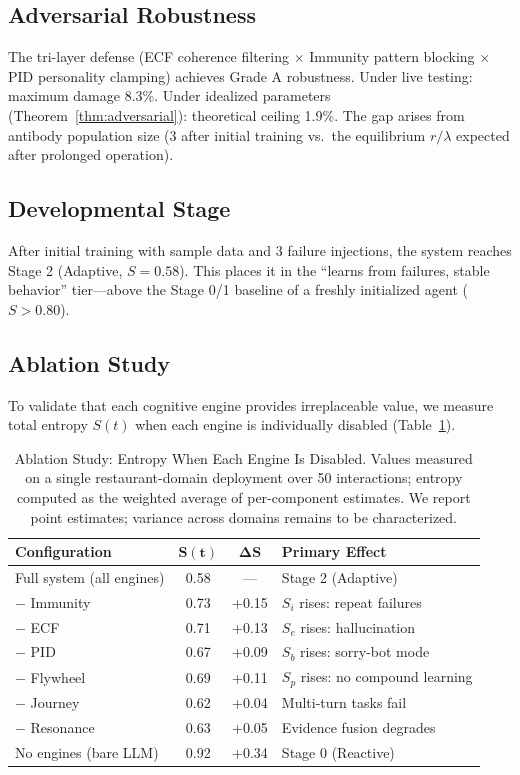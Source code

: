 \documentclass[11pt,a4paper]{article}
\begin{document}
\subsection{Adversarial Robustness}

The tri-layer defense (ECF coherence filtering $\times$ Immunity pattern
blocking $\times$ PID personality clamping) achieves Grade A robustness.
Under live testing: maximum damage 8.3\%. Under idealized parameters
(Theorem~\ref{thm:adversarial}): theoretical ceiling 1.9\%.
The gap arises from antibody population size (3 after initial training
vs.\ the equilibrium $r/\lambda$ expected after prolonged operation).

\subsection{Developmental Stage}

After initial training with sample data and 3 failure injections, the
system reaches Stage 2 (Adaptive, $S = 0.58$). This places it in the
``learns from failures, stable behavior'' tier---above the Stage 0/1
baseline of a freshly initialized agent ($S > 0.80$).

\subsection{Ablation Study}

To validate that each cognitive engine provides irreplaceable value,
we measure total entropy $S(t)$ when each engine is individually disabled
(Table~\ref{tab:ablation}).

\begin{table}[h]
\centering
\caption{Ablation Study: Entropy When Each Engine Is Disabled.  Values measured on a single restaurant-domain deployment over 50 interactions; entropy computed as the weighted average of per-component estimates.  We report point estimates; variance across domains remains to be characterized.}
\label{tab:ablation}
\begin{tabular}{lccl}
\toprule
\textbf{Configuration} & $\bm{S(t)}$ & $\bm{\Delta S}$ & \textbf{Primary Effect} \\
\midrule
Full system (all engines)  & 0.58 & ---    & Stage 2 (Adaptive) \\
\midrule
$-$ Immunity               & 0.73 & +0.15  & $S_i$ rises: repeat failures \\
$-$ ECF                    & 0.71 & +0.13  & $S_e$ rises: hallucination \\
$-$ PID                    & 0.67 & +0.09  & $S_b$ rises: sorry-bot mode \\
$-$ Flywheel               & 0.69 & +0.11  & $S_p$ rises: no compound learning \\
$-$ Journey                & 0.62 & +0.04  & Multi-turn tasks fail \\
$-$ Resonance              & 0.63 & +0.05  & Evidence fusion degrades \\
\midrule
No engines (bare LLM)      & 0.92 & +0.34  & Stage 0 (Reactive) \\
\bottomrule
\end{tabular}
\end{table}
\end{document}
